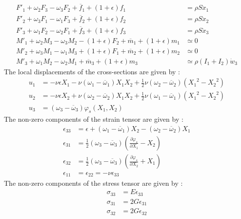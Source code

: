 \begin{subequations}
	\begin{alignat}{1}
	F'_1 + \omega_2 F_3 - \omega_3 F_2 + \overbar{f}_1 + (1+\epsilon)f_1 &= \rho S \ddot{x}_1
	\\
	F'_2 + \omega_3 F_1 - \omega_1 F_3 + \overbar{f}_2 + (1+\epsilon)f_2 &= \rho S \ddot{x}_2
	\\
	F'_3 + \omega_1 F_2 - \omega_2 F_1 + \overbar{f}_3 + (1+\epsilon)f_3 &= \rho S \ddot{x}_3
	\\
	M'_1 + \omega_2 M_3 - \omega_3 M_2 - (1+\epsilon)F_2  + \overbar{m}_1 + (1+\epsilon)m_1 & \simeq 0
	\\
	M'_2 + \omega_3 M_1 - \omega_1 M_3 + (1+\epsilon)F_1 + \overbar{m}_2 + (1+\epsilon)m_2 & \simeq 0
	\\
	M'_3 + \omega_1 M_2 - \omega_2 M_1 + \overbar{m}_3 + (1+\epsilon)m_3 & \simeq \rho (I_1 + I_2)\dot{w}_3
	\end{alignat}
\end{subequations}
The local displacements of the cross-sections are given by :
\begin{subequations}
	\begin{alignat}{1}
	u_1 &=
	-\nu \epsilon X_1 
	- \nu(\omega_1 - \overbar{\omega}_1) X_1 X_2
	+ \tfrac{1}{2}\nu(\omega_2 - \overbar{\omega}_2)({X_1}^2 - {X_2}^2)
	\\[0.5em]
	u_2 &= 
	-\nu \epsilon X_2 
	+ \nu(\omega_2 - \overbar{\omega}_2) X_1 X_2
	+ \tfrac{1}{2}\nu(\omega_1 - \overbar{\omega}_1)({X_1}^2 - {X_2}^2)
	\\[0.5em]
	u_3 &= (\omega_3 - \overbar{\omega}_3)\varphi_s(X_1,X_2)
	\end{alignat}
\end{subequations}
The non-zero components of the strain tensor are given by :
\begin{subequations}
	\begin{alignat}{1}
	\epsilon_{33} &= \epsilon + (\omega_1 - \overbar{\omega}_1) X_2 - (\omega_2 - \overbar{\omega}_2) X_1
	\\
	\epsilon_{31} &= \tfrac{1}{2}(\omega_3 - \overbar{\omega}_3)\left(\frac{\partial \varphi_s}{\partial {X_1}} - X_2 \right)
	\\
	\epsilon_{32} &= \tfrac{1}{2}(\omega_3 - \overbar{\omega}_3)\left(\frac{\partial \varphi_s}{\partial {X_2}} + X_1 \right)
	\\
	\epsilon_{11} &=  \epsilon_{22} = -\nu \epsilon_{33}
	\end{alignat}
\end{subequations}
The non-zero components of the stress tensor are given by :
\begin{subequations}
	\begin{alignat}{1}
	\sigma_{33} &= E \epsilon_{33} 
	\\
	\sigma_{31} &= 2G \epsilon_{31}
	\\
	\sigma_{32} &= 2G \epsilon_{32}
	\end{alignat}
\end{subequations}

